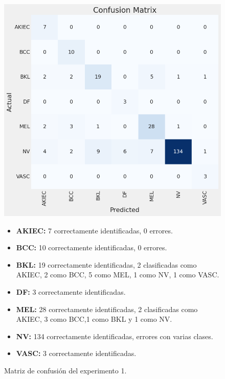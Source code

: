 \begin{figure}[H]
   \begin{minipage}{0.45\textwidth}
       \centering
       \includegraphics[width=\linewidth]{./Graphics/confussionmatrix_p1.png}
       \caption{Matriz de confusión del experimento 1.}
       \label{fig:confussion_matrix}
   \end{minipage}%
   \begin{minipage}{0.55\textwidth} 
      \small
       \begin{itemize}
           \item \textbf{AKIEC:} 7 correctamente identificadas, 0 errores.
           \item \textbf{BCC:} 10 correctamente identificadas, 0 errores.
           \item \textbf{BKL:} 19 correctamente identificadas, 2 clasificadas como AKIEC, 2 como BCC, 5 como MEL, 1 como NV, 1 como VASC.
           \item \textbf{DF:} 3 correctamente identificadas.
           \item \textbf{MEL:} 28 correctamente identificadas, 2 clasificadas como AKIEC, 3 como BCC,1 como BKL y 1 como NV.
           \item \textbf{NV:} 134 correctamente identificadas, errores con varias clases.
           \item \textbf{VASC:} 3 correctamente identificadas.
       \end{itemize}
   \end{minipage}
\end{figure}

